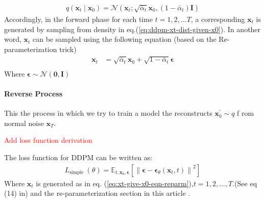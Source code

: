 \documentclass[11pt]{article}
\begin{document}
    \begin{equation}
        \label{eq:ddpm-xt-dist-given-x0}
        \begin{aligned}
            q\left(\mathbf{x}_t \mid \mathbf{x}_0\right)=\mathcal{N}\left(\mathbf{x}_t ;
            \sqrt{\bar{\alpha}_t} \mathbf{x}_0,\left(1-\bar{\alpha}_t\right) \mathbf{I}\right)
        \end{aligned}
    \end{equation}
    Accordingly, in the forward phase for each time $t=1,2,\dots T$, a corresponding $\mathbf{x}_t$ is generated by
    sampling from density in eq.(\ref{eq:ddpm-xt-dist-given-x0}). In another word, $\mathbf{x}_t$ can be sampled using
    the following equation (based on the Re-parameterization trick\cite{kingma2022autoencoding,TheRepar23:online})
    \begin{equation}
        \label{eq:xt-give-x0-eqn-reparm}
        \begin{aligned}
            \mathbf{x}_t &=\sqrt{\bar{\alpha}_t} \mathbf{x}_0+\sqrt{1-\bar{\alpha}_t} \boldsymbol{\epsilon}\\
        \end{aligned}
    \end{equation}
    Where $\bm{\epsilon} \sim \mathcal{N}(\mathbf{0},\mathbf{I})$

    \paragraph{Reverse Process}
    This the process in which we try to train a model the reconstructs $\mathbf{x}^{'}_0 \sim q$ f
    rom normal noise $\mathbf{x}_T$.

    \newline
    \textcolor{red}{Add loss function derivation}
    \newline

    The loss function for DDPM can be written as:
    \begin{equation}
        \begin{aligned}
            L_{\text {simple }}(\theta) =\mathbb{E}_{t, \mathbf{x}_0,
            \boldsymbol{\epsilon}}\left[\left\|\boldsymbol{\epsilon}-\boldsymbol{\epsilon}_
            \theta\left(\mathbf{x}_t, t\right)\right\|^2\right]
        \end{aligned}
        \label{eq:ddpm-loss-simple}
    \end{equation}
    Where $\mathbf{x}_t$ is generated as in eq. (\ref{eq:xt-give-x0-eqn-reparm}),$t=1,2,\dots,T$.(See eq (14)
    in\cite{ho2020denoising}) and the re-parameterization section in this article \cite{WhatareD38:online}.\par
\end{document}
